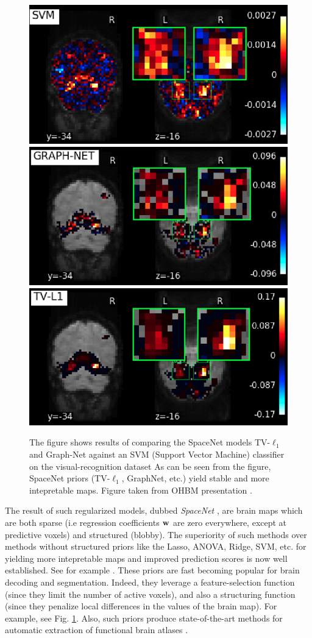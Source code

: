  \begin{figure}[!htb] 
  \includegraphics[width=.325\linewidth]{figures/svm.png}
  \includegraphics[width=.325\linewidth]{figures/graphnet.png}
  \includegraphics[width=.325\linewidth]{figures/tvl1.png}  
  \caption{The figure shows results of comparing the SpaceNet  models TV-$\ell_1$ and
    Graph-Net against an SVM (Support Vector Machine) classifier on
    the visual-recognition dataset  \citep{haxby2001}
    As can be seen from the figure, SpaceNet priors (TV-$\ell_1$, GraphNet, etc.)
    yield stable and more intepretable maps. Figure taken from OHBM
    presentation  \citep{spacenetohbm}.}
  \label{fig:spacenet_maps}
\end{figure}
  The result of such regularized models, dubbed \emph{SpaceNet}
 \citep{spacenetohbm}, are brain maps which are both
sparse (i.e regression coefficients $\mathbf{w}$ are zero everywhere, except at
predictive voxels) and structured (blobby). The superiority of such
methods over methods without structured priors like the Lasso, ANOVA,
Ridge, SVM, etc. for yielding more intepretable maps and improved
prediction scores is now well established. See for example
 \citep{baldassarre2012,gramfort2013}. These priors are fast becoming
popular for brain decoding and segmentation. Indeed, they leverage a
feature-selection function
(since they limit the number of active voxels),
and also a structuring function
(since they penalize local
differences in the values of the brain map). For example, see Fig.
\ref{fig:spacenet_maps}.
Also, such priors produce state-of-the-art methods for automatic
extraction of functional brain atlases  \citep{abraham2013}.
  
